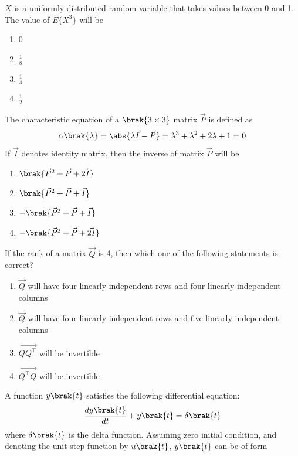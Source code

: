 \item $X$ is a uniformly distributed random variable that takes values between 0 and 1. The value of $E\{X^3\}$ will be
 \begin{enumerate}
     \item 0
     \item $\frac{1}{8}$
     \item $\frac{1}{4}$
     \item $\frac{1}{2}$ \\
 \end{enumerate}
\item The characteristic equation of a $\brak{3 \times 3}$ matrix $\vec{P}$ is defined as 
\begin{align*}
    \alpha\brak{\lambda} = \abs{\lambda\vec{I} - \vec{P}} = \lambda^3 + \lambda^2 + 2\lambda + 1 = 0
\end{align*}
If $\vec{I}$ denotes identity matrix, then the inverse of matrix $\vec{P}$ will be
\begin{enumerate}
    \item $\brak{\vec{P}^2 + \vec{P} + \vec{2I}}$
    \item $\brak{\vec{P}^2 + \vec{P} + \vec{I}}$
    \item $-\brak{\vec{P}^2 + \vec{P} + \vec{I}}$
    \item $-\brak{\vec{P}^2 + \vec{P} + \vec{2I}}$ \\
\end{enumerate}
\item If the rank of a  matrix $\vec{Q}$ is 4, then which one of the following statements is correct?
\begin{enumerate}
    \item $\vec{Q}$ will have four linearly independent rows and four linearly independent columns
    \item $\vec{Q}$ will have four linearly independent rows and five linearly independent columns
    \item $\vec{Q Q^\intercal}$ will be invertible
    \item $\vec{Q^\intercal Q}$ will be invertible \\
\end{enumerate}
\item A function $y\brak{t}$ satisfies the following differential equation:
\begin{align*}
    \frac{dy\brak{t}}{dt} + y\brak{t} = \delta\brak{t}
\end{align*}
where $\delta\brak{t}$ is the delta function. Assuming zero initial condition, and denoting the unit step function by $u\brak{t}$, $y\brak{t}$ can be of form
